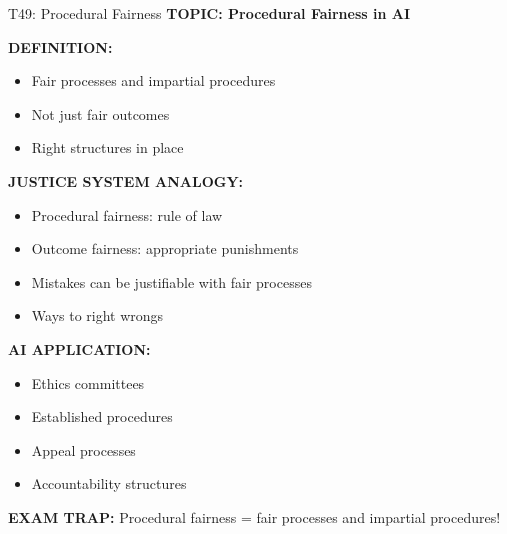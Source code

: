 \documentclass[8pt]{beamer}
\begin{document}
	\begin{frame}{T49: Procedural Fairness}
		\fontsize{6.5}{7.5}\selectfont
		\textbf{TOPIC: Procedural Fairness in AI}
		
		\vspace{0.1cm}
		\textbf{DEFINITION:}
		\begin{itemize}
			\item Fair processes and impartial procedures
			\item Not just fair outcomes
			\item Right structures in place
		\end{itemize}
		
		\vspace{0.1cm}
		\textbf{JUSTICE SYSTEM ANALOGY:}
		\begin{itemize}
			\item Procedural fairness: rule of law
			\item Outcome fairness: appropriate punishments
			\item Mistakes can be justifiable with fair processes
			\item Ways to right wrongs
		\end{itemize}
		
		\vspace{0.1cm}
		\textbf{AI APPLICATION:}
		\begin{itemize}
			\item Ethics committees
			\item Established procedures
			\item Appeal processes
			\item Accountability structures
		\end{itemize}
		
		\textcolor{myred}{\textbf{EXAM TRAP:}} Procedural fairness = \textcolor{myblue}{fair processes and impartial procedures}!
	\end{frame}
	
\end{document}
